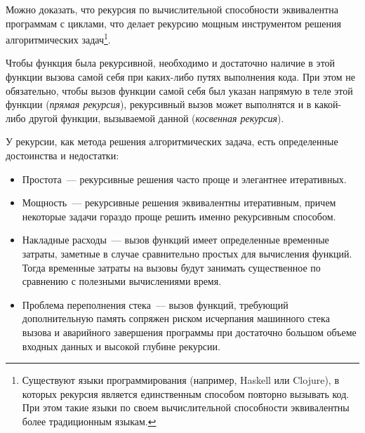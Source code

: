 Можно доказать, что рекурсия по вычислительной способности эквивалентна программам с циклами, что делает
рекурсию мощным инструментом решения алгоритмических задач\footnote{Существуют языки программирования (например, Haskell или Clojure),
  в которых рекурсия является единственным способом повторно вызывать код. При этом такие языки по своем вычислительной
  способности эквивалентны более традиционным языкам.}.

Чтобы функция была рекурсивной, необходимо и достаточно наличие в этой функции вызова самой себя при каких-либо путях выполнения кода. При этом
не обязательно, чтобы вызов функции самой себя был указан напрямую в теле этой функции (\textit{прямая рекурсия}), рекурсивный вызов может
выполнятся и в какой-либо другой функции, вызываемой данной (\textit{косвенная рекурсия}).

У рекурсии, как метода решения алгоритмических задача, есть определенные достоинства и недостатки:
\begin{itemize}
  \item Простота~--- рекурсивные решения часто проще и элегантнее итеративных.
  \item Мощность~--- рекурсивные решения эквивалентны итеративным, причем некоторые задачи гораздо проще решить
        именно рекурсивным способом.
  \item Накладные расходы~--- вызов функций имеет определенные временные затраты, заметные в случае сравнительно
        простых для вычисления функций. Тогда временные затраты на вызовы будут занимать существенное по сравнению с
        полезными вычислениями время.
  \item Проблема переполнения стека~--- вызов функций, требующий дополнительную память сопряжен риском исчерпания машинного стека
        вызова и аварийного завершения программы при достаточно большом объеме входных данных и высокой глубине рекурсии.
\end{itemize}

